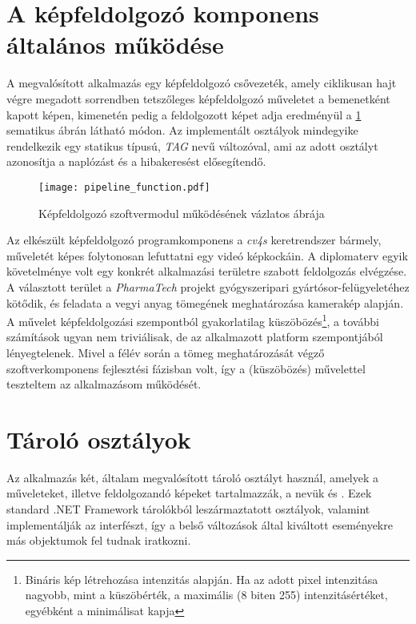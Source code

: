 \section{A képfeldolgozó komponens általános működése}

A megvalósított alkalmazás egy képfeldolgozó csővezeték, amely ciklikusan hajt végre megadott sorrendben tetszőleges képfeldolgozó műveletet a bemenetként kapott képen, kimenetén pedig a feldolgozott képet adja eredményül a \ref{fig:pipeline_function} sematikus ábrán látható módon. Az implementált osztályok mindegyike rendelkezik egy statikus  típusú, \emph{TAG} nevű változóval, ami az adott osztályt azonosítja a naplózást és a hibakeresést elősegítendő.

\begin{figure}[h]
\vspace{.5cm}
\texttt{[image: pipeline\_function.pdf]}
\centering
\vspace{.2cm}
\caption{Képfeldolgozó szoftvermodul működésének vázlatos ábrája}
\vspace{.5cm}
\label{fig:pipeline_function}
\end{figure}

Az elkészült képfeldolgozó programkomponens a \emph{cv4s} keretrendszer bármely,  műveletét képes folytonosan lefuttatni egy videó képkockáin. A diplomaterv egyik követelménye volt egy konkrét alkalmazási területre szabott feldolgozás elvégzése. A választott terület a \emph{PharmaTech} projekt gyógyszeripari gyártósor-felügyeletéhez kötődik, és feladata a vegyi anyag tömegének meghatározása kamerakép alapján. A művelet képfeldolgozási szempontból gyakorlatilag küszöbözés\footnote{Bináris kép létrehozása intenzitás alapján. Ha az adott pixel intenzitása nagyobb, mint a küszöbérték, a maximális (8 biten 255) intenzitásértéket, egyébként a minimálisat kapja}, a további számítások ugyan nem triviálisak, de az alkalmazott platform szempontjából lényegtelenek. Mivel a félév során a tömeg meghatározását végző szoftverkomponens fejlesztési fázisban volt, így a  (küszöbözés) művelettel teszteltem az alkalmazásom működését.

\section{Tároló osztályok}

Az alkalmazás két, általam megvalósított tároló osztályt használ, amelyek a műveleteket, illetve feldolgozandó képeket tartalmazzák, a nevük  és . Ezek standard .NET Framework tárolókból leszármaztatott osztályok, valamint implementálják az   interfészt, így a belső változások által kiváltott eseményekre más objektumok fel tudnak iratkozni.

